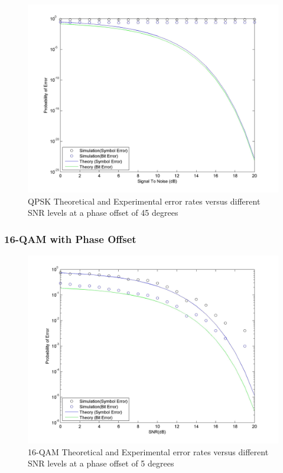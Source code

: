 \documentclass[]{article}
\begin{document}
\begin{figure}[H]
\centering
\hspace*{-2cm}\includegraphics[width=1.3\textwidth]{qpSNRpo4.jpg}
\caption{QPSK Theoretical and Experimental error rates versus different SNR levels at a phase offset of 45 degrees }
\end{figure}


\subsubsection{16-QAM with Phase Offset}
\label{qam16_phase}
\begin{figure}[H]
\centering
\hspace*{-2cm}\includegraphics[width=1.3\textwidth]{qam16SNRpo1.jpg}
\caption{16-QAM Theoretical and Experimental error rates versus different SNR levels at a phase offset of 5 degrees }
\end{figure}
\end{document}
